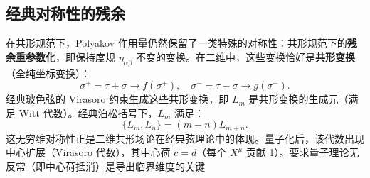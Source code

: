 \subsection*{经典对称性的残余}

在共形规范下，Polyakov 作用量仍然保留了一类特殊的对称性：共形规范下的\textbf{残余重参数化}，即保持度规 $\eta_{\alpha\beta}$ 不变的变换。在二维中，这些变换恰好是\textbf{共形变换}（全纯坐标变换）：
\begin{equation}
\sigma^+ = \tau+\sigma \to f(\sigma^+),\quad \sigma^- = \tau-\sigma \to g(\sigma^-).
\end{equation}
经典玻色弦的 Virasoro 约束生成这些共形变换，即 $L_m$ 是共形变换的生成元（满足 Witt 代数）。经典泊松括号下，$L_m$ 满足：
\begin{equation}
\{L_m, L_n\} = (m-n)L_{m+n}.
\end{equation}
这无穷维对称性正是二维共形场论在经典弦理论中的体现。量子化后，该代数出现中心扩展（Virasoro 代数），其中心荷 $c=d$（每个 $X^\mu$ 贡献 1）。要求量子理论无反常（即中心荷抵消）是导出临界维度的关键


